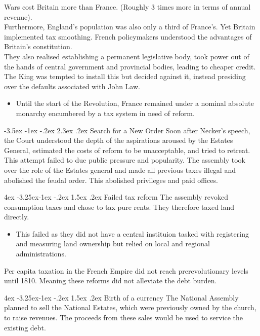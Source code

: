 \documentclass[]{article}
\makeatletter
\newcommand{\bb}{\bigbreak\noindent}
\renewcommand\section{\leftskip 0pt\@startsection {section}{1}{\z@}%
	{-3.5ex \@plus -1ex \@minus -.2ex}%
	{2.3ex \@plus.2ex}%
	{\normalfont\Large\bfseries}}
\renewcommand\subsection{\leftskip 4ex\@startsection{subsection}{2}{\z@}%
	{-3.25ex\@plus -1ex \@minus -.2ex}%
	{1.5ex \@plus .2ex}%
	{\normalfont\large\bfseries}}
\makeatother
\begin{document}
	\bb
	Wars cost Britain more than France. (Roughly 3 times more in terms of annual revenue). \\
	Furthermore, England's population was also only a third of France's.
	\bb
	Yet Britain implemented tax smoothing.
	\bb
	French policymakers understood the advantages of Britain's constitution.\\
	They also realised establishing a permanent legislative body, took power out of the hands of central government and provincial bodies, leading to cheaper credit.
	\bb
	The King was tempted to install this but decided against it, instead presiding over the defaults associated with John Law.
	\begin{itemize}
		\item Until the start of the Revolution, France remained under a nominal absolute monarchy encumbered by a tax system in need of reform.
	\end{itemize}

\section{Search for a New Order}
Soon after Necker's speech, the Court understood the depth of the aspirations aroused by the Estates General, estimated the costs of reform to be unacceptable, and tried to retreat. This attempt failed to due public pressure and popularity.
\bb
The assembly took over the role of the Estates general and made all previous taxes illegal and abolished the feudal order. This abolished privileges and paid offices.

	\subsection{Failed tax reform}
	The assembly revoked consumption taxes and chose to tax pure rents. They therefore taxed land directly.
	\begin{itemize}[leftmargin=10ex]
		\item This failed as they did not have a central instituion tasked with registering and measuring land ownership but relied on local and regional administrations.
	\end{itemize}
	\bb
	Per capita taxation in the French Empire did not reach prerevolutionary levels until 1810. Meaning these reforms did not alleviate the debt burden.
	
	\subsection{Birth of a currency}
	The National Assembly planned to sell the National Estates, which were previously owned by the church, to raise revenues. The proceeds from these sales would be used to service the existing debt.
	
\end{document}
